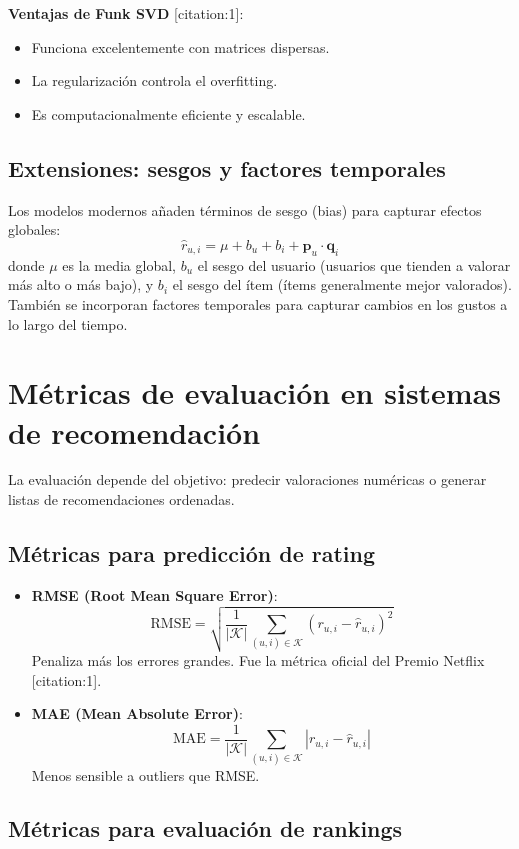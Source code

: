\documentclass[12pt,a4paper,openany,oneside]{book}
\begin{document}
\textbf{Ventajas de Funk SVD} [citation:1]:
\begin{itemize}
    \item Funciona excelentemente con matrices dispersas.
    \item La regularización controla el overfitting.
    \item Es computacionalmente eficiente y escalable.
\end{itemize}

\subsection{Extensiones: sesgos y factores temporales}
Los modelos modernos añaden términos de sesgo (bias) para capturar efectos globales:
\[
\hat{r}_{u,i} = \mu + b_u + b_i + \mathbf{p}_u \cdot \mathbf{q}_i
\]
donde \(\mu\) es la media global, \(b_u\) el sesgo del usuario (usuarios que tienden a valorar más alto o más bajo), y \(b_i\) el sesgo del ítem (ítems generalmente mejor valorados). También se incorporan factores temporales para capturar cambios en los gustos a lo largo del tiempo.

\section{Métricas de evaluación en sistemas de recomendación}

La evaluación depende del objetivo: predecir valoraciones numéricas o generar listas de recomendaciones ordenadas.

\subsection{Métricas para predicción de rating}
\begin{itemize}
    \item \textbf{RMSE (Root Mean Square Error)}: 
    \[
    \text{RMSE} = \sqrt{\frac{1}{|\mathcal{K}|} \sum_{(u,i) \in \mathcal{K}} (r_{u,i} - \hat{r}_{u,i})^2}
    \]
    Penaliza más los errores grandes. Fue la métrica oficial del Premio Netflix [citation:1].
    
    \item \textbf{MAE (Mean Absolute Error)}:
    \[
    \text{MAE} = \frac{1}{|\mathcal{K}|} \sum_{(u,i) \in \mathcal{K}} |r_{u,i} - \hat{r}_{u,i}|
    \]
    Menos sensible a outliers que RMSE.
\end{itemize}

\subsection{Métricas para evaluación de rankings}
\end{document}
